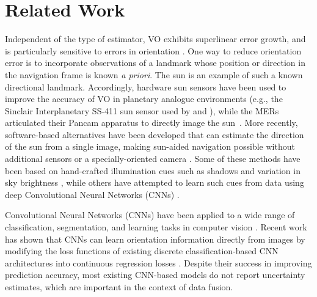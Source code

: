 \section{Related Work}


Independent of the type of estimator, VO exhibits superlinear error growth, and is particularly sensitive to errors in orientation \citep{Olson2003-ax, Cvisic2015-mt}. 
One way to reduce orientation error is to incorporate observations of a landmark whose position or direction in the navigation frame is known \emph{a priori}. 
The sun is an example of such a known directional landmark. 
Accordingly, hardware sun sensors have been used to improve the accuracy of VO in planetary analogue environments (e.g., the Sinclair Interplanetary SS-411 sun sensor used by \citet{Furgale2011-zu} and \citet{Lambert2012-sn}), while the MERs articulated their Pancam apparatus to directly image the sun~\citep{Maimone2007-tc,Eisenman2002-cg}. 
More recently, software-based alternatives have been developed that can estimate the direction of the sun from a single image, making sun-aided navigation possible without additional sensors or a specially-oriented camera \citep{2017_Clement_Improving}. 
Some of these methods have been based on hand-crafted illumination cues such as shadows and variation in sky brightness \citep{Lalonde2011-jw,2017_Clement_Improving}, while others have attempted to learn such cues from data using deep Convolutional Neural Networks (CNNs) \citep{Ma2016-at}.

Convolutional Neural Networks (CNNs) have been applied to a wide range of classification, segmentation, and learning tasks in computer vision \citep{LeCun2015-qf}. 
Recent work has shown that CNNs can learn orientation information directly from images by modifying the loss functions of existing discrete classification-based CNN architectures into continuous regression losses \citep{Ma2016-at, Kendall2015-ew, Kendall2016-zf}. 
Despite their success in improving prediction accuracy, most existing CNN-based models do not report uncertainty estimates, which are important in the context of data fusion.

